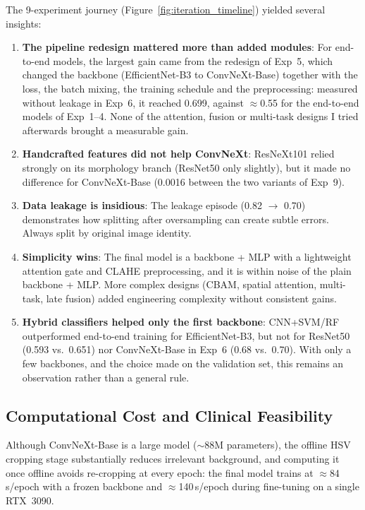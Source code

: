 \documentclass[twocolumn,a4paper]{article}
\begin{document}
The 9-experiment journey (Figure~\ref{fig:iteration_timeline}) yielded several insights:

\begin{enumerate}
    \item \textbf{The pipeline redesign mattered more than added modules}: For end-to-end models, the largest gain came from the redesign of Exp~5, which changed the backbone (EfficientNet-B3 to ConvNeXt-Base) together with the loss, the batch mixing, the training schedule and the preprocessing: measured without leakage in Exp~6, it reached 0.699, against $\approx$0.55 for the end-to-end models of Exp~1--4. None of the attention, fusion or multi-task designs I tried afterwards brought a measurable gain.
    \item \textbf{Handcrafted features did not help ConvNeXt}: ResNeXt101 relied strongly on its morphology branch (ResNet50 only slightly), but it made no difference for ConvNeXt-Base (0.0016 between the two variants of Exp~9).
    \item \textbf{Data leakage is insidious}: The leakage episode (0.82 $\to$ 0.70) demonstrates how splitting after oversampling can create subtle errors. Always split by original image identity.
    \item \textbf{Simplicity wins}: The final model is a backbone + MLP with a lightweight attention gate and CLAHE preprocessing, and it is within noise of the plain backbone + MLP. More complex designs (CBAM, spatial attention, multi-task, late fusion) added engineering complexity without consistent gains.
    \item \textbf{Hybrid classifiers helped only the first backbone}: CNN+SVM/RF outperformed end-to-end training for EfficientNet-B3, but not for ResNet50 (0.593 vs.\ 0.651) nor ConvNeXt-Base in Exp~6 (0.68 vs.\ 0.70). With only a few backbones, and the choice made on the validation set, this remains an observation rather than a general rule.
\end{enumerate}

\subsection{Computational Cost and Clinical Feasibility}

Although ConvNeXt-Base is a large model ($\sim$88M parameters), the offline HSV cropping stage substantially reduces irrelevant background, and computing it once offline avoids re-cropping at every epoch: the final model trains at $\approx$84\,s/epoch with a frozen backbone and $\approx$140\,s/epoch during fine-tuning on a single RTX~3090.
\end{document}
